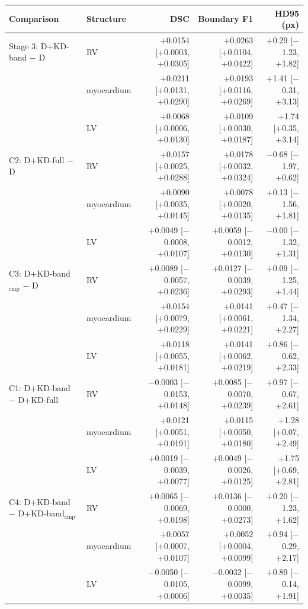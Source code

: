 \begin{tabular}{@{}llrrr@{}}
\toprule
Comparison & Structure & DSC & Boundary F1 & HD95 (px) \\
\midrule
Stage 3: D+KD-band $-$ D & RV & +0.0154 [+0.0003, +0.0305] & +0.0263 [+0.0104, +0.0422] & +0.29 [$-$1.23, +1.82] \\
 & myocardium & +0.0211 [+0.0131, +0.0290] & +0.0193 [+0.0116, +0.0269] & +1.41 [$-$0.31, +3.13] \\
 & LV & +0.0068 [+0.0006, +0.0130] & +0.0109 [+0.0030, +0.0187] & +1.74 [+0.35, +3.14] \\
\midrule
C2: D+KD-full $-$ D & RV & +0.0157 [+0.0025, +0.0288] & +0.0178 [+0.0032, +0.0324] & $-$0.68 [$-$1.97, +0.62] \\
 & myocardium & +0.0090 [+0.0035, +0.0145] & +0.0078 [+0.0020, +0.0135] & +0.13 [$-$1.56, +1.81] \\
 & LV & +0.0049 [$-$0.0008, +0.0107] & +0.0059 [$-$0.0012, +0.0130] & $-$0.00 [$-$1.32, +1.31] \\
\midrule
C3: D+KD-band$_{\mathrm{cmp}}$ $-$ D & RV & +0.0089 [$-$0.0057, +0.0236] & +0.0127 [$-$0.0039, +0.0293] & +0.09 [$-$1.25, +1.44] \\
 & myocardium & +0.0154 [+0.0079, +0.0229] & +0.0141 [+0.0061, +0.0221] & +0.47 [$-$1.34, +2.27] \\
 & LV & +0.0118 [+0.0055, +0.0181] & +0.0141 [+0.0062, +0.0219] & +0.86 [$-$0.62, +2.33] \\
\midrule
C1: D+KD-band $-$ D+KD-full & RV & $-$0.0003 [$-$0.0153, +0.0148] & +0.0085 [$-$0.0070, +0.0239] & +0.97 [$-$0.67, +2.61] \\
 & myocardium & +0.0121 [+0.0051, +0.0191] & +0.0115 [+0.0050, +0.0180] & +1.28 [+0.07, +2.49] \\
 & LV & +0.0019 [$-$0.0039, +0.0077] & +0.0049 [$-$0.0026, +0.0125] & +1.75 [+0.69, +2.81] \\
\midrule
C4: D+KD-band $-$ D+KD-band$_{\mathrm{cmp}}$ & RV & +0.0065 [$-$0.0069, +0.0198] & +0.0136 [$-$0.0000, +0.0273] & +0.20 [$-$1.23, +1.62] \\
 & myocardium & +0.0057 [+0.0007, +0.0107] & +0.0052 [+0.0004, +0.0099] & +0.94 [$-$0.29, +2.17] \\
 & LV & $-$0.0050 [$-$0.0105, +0.0006] & $-$0.0032 [$-$0.0099, +0.0035] & +0.89 [$-$0.14, +1.91] \\
\bottomrule
\end{tabular}
